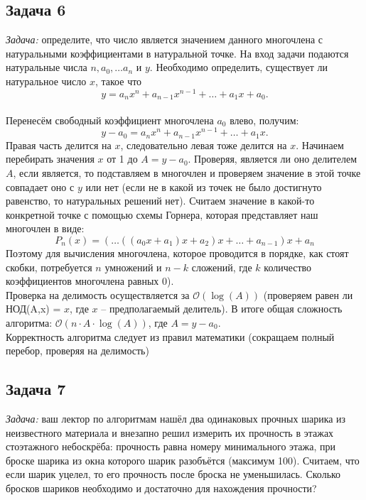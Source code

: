 \documentclass[a4paper,12pt]{article} %
\begin{document}
\subsection*{Задача 6}
\textit{Задача:} определите, что число является значением данного многочлена с натуральными коэффициентами в натуральной точке. На вход задачи подаются натуральные числа $n, a_0, \ldots a_n$ и $y$. Необходимо определить, существует ли натуральное число $x$, такое что $$ y = a_n x^n + a_{n-1} x^{n-1} + \ldots + a_1x +  a_0. $$\\

Перенесём свободный коэффициент многочлена $ a_0 $ влево, получим:
$$ y - a_0 = a_n x^n + a_{n-1} x^{n-1} + \ldots + a_1x . $$
Правая часть делится на $ x $, следовательно левая тоже делится на $ x $. Начинаем перебирать значения $ x $ от 1 до $A = y - a_0 $. Проверяя, является ли оно делителем $ A $, если является, то подставляем в многочлен и проверяем значение в этой точке совпадает оно с $ y $ или нет (если не в какой из точек не было достигнуто равенство, то натуральных решений нет). Считаем значение в какой-то конкретной точке с помощью схемы Горнера, которая представляет наш многочлен в виде:
$$
P_{n}(x)=\left(\ldots\left(\left(a_{0} x+a_{1}\right) x+a_{2}\right) x+\ldots+a_{n-1}\right) x+a_{n}
$$
Поэтому для вычисления многочлена, которое проводится в порядке, как стоят скобки, потребуется $ n $ умножений и $ n-k $ сложений, где $ k $ количество коэффициентов многочлена равных 0).\\
Проверка на делимость осуществляется за $\mathcal{O}(\log(A)) $ (проверяем равен ли НОД(A,x) = $ x $, где $ x $ -- предполагаемый делитель). В итоге общая сложность алгоритма: $\mathcal{O}(n \cdot A \cdot \log(A)) $, где $ A = y-a_0 $.\\
Корректность алгоритма следует из правил математики (сокращаем полный перебор, проверяя на делимость) 


\subsection*{Задача 7}
\textit{Задача:} ваш лектор по алгоритмам нашёл два одинаковых прочных шарика из неизвестного материала и внезапно решил измерить их прочность в этажах стоэтажного небоскрёба: прочность равна номеру минимального этажа, при броске шарика из окна которого шарик разобъётся (максимум 100). Считаем, что если шарик уцелел, то его прочность после броска не уменьшилась. Сколько бросков шариков необходимо и достаточно для нахождения прочности?\\
\end{document}
